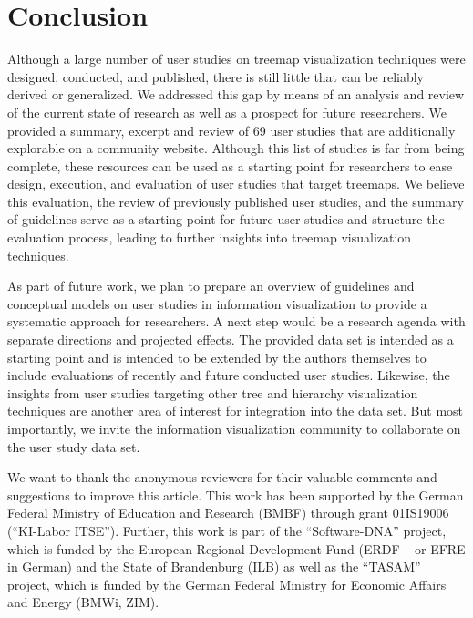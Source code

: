 \documentclass[sigconf,
natbib=true]{acmart}
\begin{document}
\section{Conclusion}
\label{sec:conclusions}
Although a large number of user studies on treemap visualization techniques were designed, conducted, and published, there is still little that can be reliably derived or generalized.
We addressed this gap by means of an analysis and review of the current state of research as well as a prospect for future researchers.
We provided a summary, excerpt and review of 69 user studies that are additionally explorable on a community website.
Although this list of studies is far from being complete, these resources can be used as a starting point for researchers to ease design, execution, and evaluation of user studies that target treemaps.
We believe this evaluation, the review of previously published user studies, and the summary of guidelines serve as a starting point for future user studies and structure the evaluation process, leading to further insights into treemap visualization techniques.
\par
As part of future work, we plan to prepare an overview of guidelines and conceptual models on user studies in information visualization to provide a systematic approach for researchers.
A next step would be a research agenda with separate directions and projected effects.
The provided data set is intended as a starting point and is intended to be extended by the authors themselves to include evaluations of recently and future conducted user studies.
Likewise, the insights from user studies targeting other tree and hierarchy visualization techniques are another area of interest for integration into the data set.
But most importantly, we invite the information visualization community to collaborate on the user study data set.

\begin{acks}
We want to thank the anonymous reviewers for their valuable comments and suggestions to improve this article.
This work has been supported by the German Federal Ministry of Education and Research (BMBF) through grant 01IS19006  (\enquote{KI-Labor ITSE}).
Further, this work is part of the \enquote{Software-DNA} project, which is funded by the
European Regional Development Fund (ERDF -- or EFRE in German) and the
State of Brandenburg (ILB) as well as the \enquote{TASAM} project, which is funded by the German Federal Ministry for Economic Affairs and Energy (BMWi, ZIM).
\end{acks}



\end{document}
